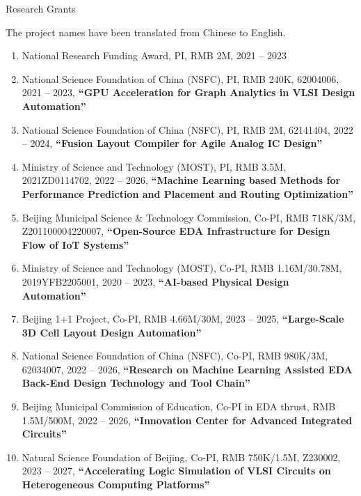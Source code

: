 \begin{rSection}{Research Grants}

  The project names have been translated from Chinese to English. 

\begin{enumerate}[font=\normalfont]

\item National Research Funding Award, PI, RMB 2M, 2021 -- 2023

\item National Science Foundation of China (NSFC), PI, RMB 240K, 62004006, 2021 -- 2023, \textbf{``GPU Acceleration for Graph Analytics in VLSI Design Automation''}

\item National Science Foundation of China (NSFC), PI, RMB 2M, 62141404, 2022 -- 2024, \textbf{``Fusion Layout Compiler for Agile Analog IC Design''}

\item Ministry of Science and Technology (MOST), PI, RMB 3.5M, 2021ZD0114702, 2022 -- 2026, \textbf{``Machine Learning based Methods for Performance Prediction and Placement and Routing Optimization''}

\item Beijing Municipal Science \& Technology Commission, Co-PI, RMB 718K/3M, Z201100004220007, \textbf{``Open-Source EDA Infrastructure for Design Flow of IoT Systems''}

\item Ministry of Science and Technology (MOST), Co-PI, RMB 1.16M/30.78M, 2019YFB2205001, 2020 -- 2023, \textbf{``AI-based Physical Design Automation''}

\item Beijing 1+1 Project, Co-PI, RMB 4.66M/30M, 2023 -- 2025, \textbf{``Large-Scale 3D Cell Layout Design Automation''}

\item National Science Foundation of China (NSFC), Co-PI, RMB 980K/3M, 62034007, 2022 -- 2026, \textbf{``Research on Machine Learning Assisted EDA Back-End Design Technology and Tool Chain''}

\item Beijing Municipal Commission of Education, Co-PI in EDA thrust, RMB 1.5M/500M, 2022 -- 2026, \textbf{``Innovation Center for Advanced Integrated Circuits''}

\item Natural Science Foundation of Beijing, Co-PI, RMB 750K/1.5M, Z230002, 2023 -- 2027, \textbf{``Accelerating Logic Simulation of VLSI Circuits on Heterogeneous Computing Platforms''}


\end{enumerate}
\end{rSection}
